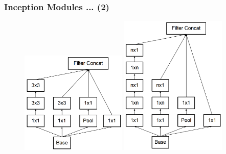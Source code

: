 \documentclass[9pt]{beamer}
\begin{document}
\begin{frame}
	\frametitle{Inception Modules ... (2)}
	\begin{figure}
		\includegraphics[width=0.45\textwidth]{./figures/edit/breakdown_01.png}
		\hspace{0.05\textwidth} 
		\includegraphics[width=0.45\textwidth]{./figures/edit/breakdown_02.png}
	\end{figure}
\end{frame}
\end{document}
